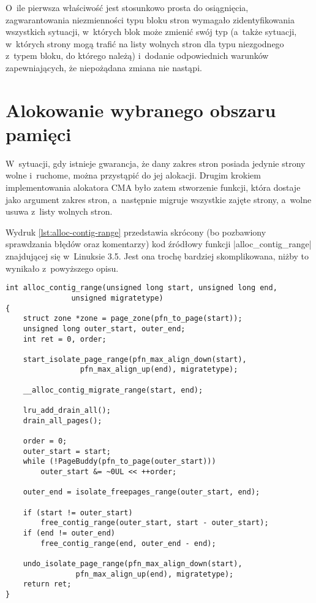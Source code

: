 O~ile pierwsza właściwość jest stosunkowo prosta do osiągnięcia,
zagwarantowania niezmienności typu bloku stron wymagało
zidentyfikowania wszystkich sytuacji, w~których blok może zmienić swój
typ (a~także sytuacji, w~których strony mogą trafić na listy wolnych
stron dla typu niezgodnego z~typem bloku, do którego należą) i~dodanie
odpowiednich warunków zapewniających, że niepożądana zmiana nie
nastąpi.

\section{Alokowanie wybranego obszaru pamięci}\label{sec:alloc-contig-range}

W~sytuacji, gdy istnieje gwarancja, że dany zakres stron posiada
jedynie strony wolne i~ruchome, można przystąpić do jej alokacji.
Drugim krokiem implementowania alokatora CMA było zatem stworzenie
funkcji, która dostaje jako argument zakres stron, a~następnie migruje
wszystkie zajęte strony, a~wolne usuwa z~listy wolnych stron.

Wydruk \ref{lst:alloc-contig-range} przedstawia skrócony (bo
pozbawiony sprawdzania błędów oraz komentarzy) kod źródłowy funkcji
\code|alloc_contig_range| znajdującej się w~Linuksie 3.5.  Jest ona
trochę bardziej skomplikowana, niżby to wynikało z~powyższego opisu.

\begin{lstlisting}[float=tbhp,caption=Skrócony wydruk funkcji
    \code|alloc_conting_range| z Linuksa 3.5.,label=lst:alloc-contig-range]
int alloc_contig_range(unsigned long start, unsigned long end,
		       unsigned migratetype)
{
	struct zone *zone = page_zone(pfn_to_page(start));
	unsigned long outer_start, outer_end;
	int ret = 0, order;

	start_isolate_page_range(pfn_max_align_down(start),
				 pfn_max_align_up(end), migratetype);

	__alloc_contig_migrate_range(start, end);

	lru_add_drain_all();
	drain_all_pages();

	order = 0;
	outer_start = start;
	while (!PageBuddy(pfn_to_page(outer_start)))
		outer_start &= ~0UL << ++order;

	outer_end = isolate_freepages_range(outer_start, end);

	if (start != outer_start)
		free_contig_range(outer_start, start - outer_start);
	if (end != outer_end)
		free_contig_range(end, outer_end - end);

	undo_isolate_page_range(pfn_max_align_down(start),
				pfn_max_align_up(end), migratetype);
	return ret;
}
\end{lstlisting}

